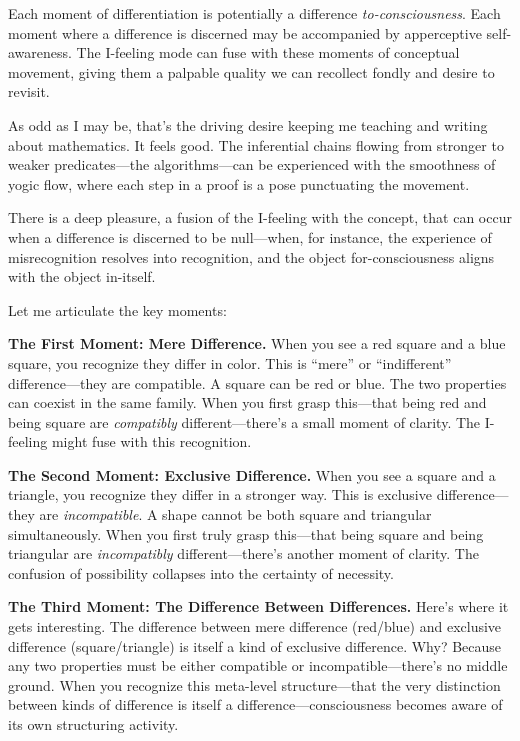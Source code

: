\documentclass[12pt]{book}
\begin{document}
Each moment of differentiation is potentially a difference \emph{to-consciousness}. Each moment where a difference is discerned may be accompanied by apperceptive self-awareness. The I-feeling mode can fuse with these moments of conceptual movement, giving them a palpable quality we can recollect fondly and desire to revisit.

As odd as I may be, that's the driving desire keeping me teaching and writing about mathematics. It feels good. The inferential chains flowing from stronger to weaker predicates---the algorithms---can be experienced with the smoothness of yogic flow, where each step in a proof is a pose punctuating the movement.

There is a deep pleasure, a fusion of the I-feeling with the concept, that can occur when a difference is discerned to be null---when, for instance, the experience of misrecognition resolves into recognition, and the object for-consciousness aligns with the object in-itself.

Let me articulate the key moments:

\textbf{The First Moment: Mere Difference.} When you see a red square and a blue square, you recognize they differ in color. This is ``mere'' or ``indifferent'' difference---they are compatible. A square can be red or blue. The two properties can coexist in the same family. When you first grasp this---that being red and being square are \emph{compatibly} different---there's a small moment of clarity. The I-feeling might fuse with this recognition.

\textbf{The Second Moment: Exclusive Difference.} When you see a square and a triangle, you recognize they differ in a stronger way. This is exclusive difference---they are \emph{incompatible}. A shape cannot be both square and triangular simultaneously. When you first truly grasp this---that being square and being triangular are \emph{incompatibly} different---there's another moment of clarity. The confusion of possibility collapses into the certainty of necessity.

\textbf{The Third Moment: The Difference Between Differences.} Here's where it gets interesting. The difference between mere difference (red/blue) and exclusive difference (square/triangle) is itself a kind of exclusive difference. Why? Because any two properties must be either compatible or incompatible---there's no middle ground. When you recognize this meta-level structure---that the very distinction between kinds of difference is itself a difference---consciousness becomes aware of its own structuring activity.
\end{document}
